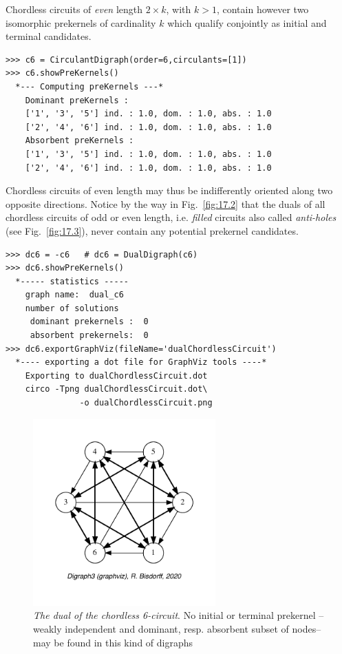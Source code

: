 Chordless circuits of \emph{even} length $2 \times k$, with $k > 1$, contain however two isomorphic prekernels of cardinality $k$ which qualify conjointly as initial and terminal candidates.
\begin{lstlisting}[caption={The prekernels of the 6-circuit digraph},label=list:17.6]
>>> c6 = CirculantDigraph(order=6,circulants=[1])
>>> c6.showPreKernels()
  *--- Computing preKernels ---*
    Dominant preKernels :
    ['1', '3', '5'] ind. : 1.0, dom. : 1.0, abs. : 1.0
    ['2', '4', '6'] ind. : 1.0, dom. : 1.0, abs. : 1.0
    Absorbent preKernels :
    ['1', '3', '5'] ind. : 1.0, dom. : 1.0, abs. : 1.0
    ['2', '4', '6'] ind. : 1.0, dom. : 1.0, abs. : 1.0
\end{lstlisting}

Chordless circuits of even length may thus be indifferently oriented along two opposite directions. Notice by the way in Fig.~\vref{fig:17.2} that the duals of all chordless circuits of odd or even length, i.e. \emph{filled} circuits also called \emph{anti-holes} (see Fig.~\vref{fig:17.3}), never contain any potential prekernel candidates.
\begin{lstlisting}[caption={The prekernels of the dual of the 6-circuit digraph},label=list:17.7]
>>> dc6 = -c6   # dc6 = DualDigraph(c6)
>>> dc6.showPreKernels()
  *----- statistics -----
    graph name:  dual_c6
    number of solutions
     dominant prekernels :  0
     absorbent prekernels:  0
>>> dc6.exportGraphViz(fileName='dualChordlessCircuit')
  *---- exporting a dot file for GraphViz tools ----*
    Exporting to dualChordlessCircuit.dot
    circo -Tpng dualChordlessCircuit.dot\
               -o dualChordlessCircuit.png
\end{lstlisting}
\begin{figure}[ht]
\sidecaption[t]
\includegraphics[width=7cm]{Figures/17-2-dualChordlessCircuit.pdf}
\caption[The dual of the chordless 6-circuit]{\emph{The dual of the chordless 6-circuit}. No initial or terminal prekernel --weakly independent and dominant, resp. absorbent subset of nodes-- may be found in this kind of digraphs}
\label{fig:17.2}       %
\end{figure}

